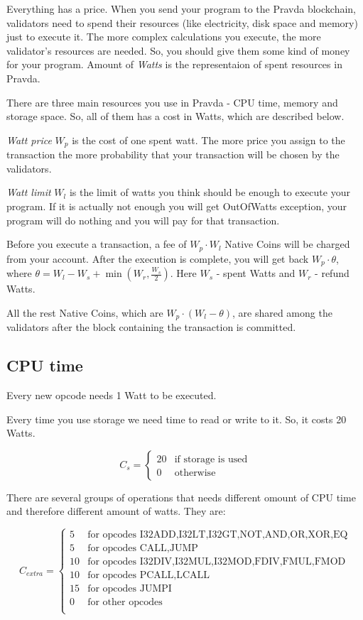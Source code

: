 \documentclass[12pt,a4paper]{article}
\begin{document}
Everything has a price. When you send your program to the Pravda blockchain, validators need to spend their resources (like electricity, disk space and memory) just to execute it. The more complex calculations you execute, the more validator's resources are needed. So, you should give them some kind of money for your program. Amount of \emph{Watts} is the representaion of spent resources in Pravda.

There are three main resources you use in Pravda - CPU time, memory and storage space. So, all of them has a cost in Watts, which are described below.

\emph{Watt price} $W_p$ is the cost of one spent watt. The more price you assign to the transaction the more probability that your transaction will be chosen by the validators.

\emph{Watt limit} $W_l$ is the limit of watts you think should be enough to execute your program. If it is actually not enough you will get OutOfWatts exception, your program will do nothing and you will pay for that transaction.

Before you execute a transaction, a fee of $W_p \cdot W_l$ Native Coins will be charged from your account. After the execution is complete, you will get back $W_p \cdot \theta$, where $\theta = W_l - W_s + \min(W_r, \frac{W_s}{2})$. Here $W_s$ - spent Watts and $W_r$ - refund Watts. 

All the rest Native Coins, which are $W_p \cdot (W_l - \theta)$, are shared among the validators after the block containing the transaction is committed.

\subsection{CPU time}

Every new opcode needs 1 Watt to be executed.

Every time you use storage we need time to read or write to it. So, it costs 20 Watts.

$$
C_s = \begin{cases} 
	20 & \text{if storage is used} \\
	0  & \text{otherwise}
	\end{cases}
$$


There are several groups of operations that needs different omount of CPU time and therefore different amount of watts. They are:

$$
C_{extra} = \begin{cases} 
			5 & \text{for opcodes I32ADD,I32LT,I32GT,NOT,AND,OR,XOR,EQ} \\ %
			5 & \text{for opcodes CALL,JUMP} \\ %
			10 & \text{for opcodes I32DIV,I32MUL,I32MOD,FDIV,FMUL,FMOD} \\ %
			10 & \text{for opcodes PCALL,LCALL} \\ %
			15 & \text{for opcodes JUMPI} \\
			0 & \text{for other opcodes} \\
			\end{cases}
$$
\end{document}
